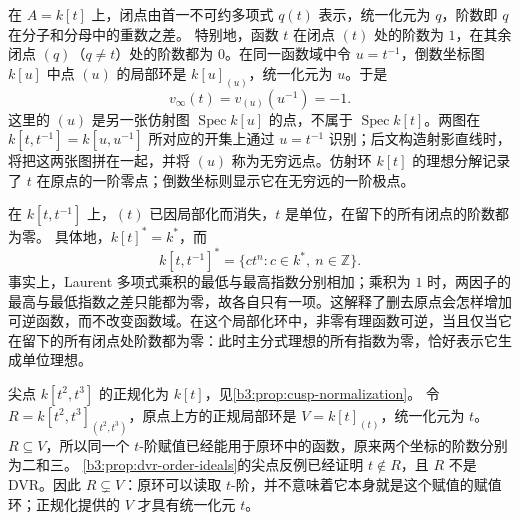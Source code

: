 \ProseParagraphBreak
在 \(A=k[t]\) 上，闭点由首一不可约多项式 \(q(t)\) 表示，统一化元为 \(q\)，阶数即 \(q\) 在分子和分母中的重数之差。 特别地，函数 \(t\) 在闭点 \((t)\) 处的阶数为 \(1\)，在其余闭点 \((q)\)（\(q\ne t\)）处的阶数都为 \(0\)。在同一函数域中令 \(u=t^{-1}\)，倒数坐标图 \(k[u]\) 中点 \((u)\) 的局部环是 \(k[u]_{(u)}\)，统一化元为 \(u\)。于是
\[
	v_\infty(t)=v_{(u)}(u^{-1})=-1.
\]
这里的 \((u)\) 是另一张仿射图 \(\operatorname{Spec}k[u]\) 的点，不属于 \(\operatorname{Spec}k[t]\)。两图在 \(k[t,t^{-1}]=k[u,u^{-1}]\) 所对应的开集上通过 \(u=t^{-1}\) 识别；后文构造射影直线时，将把这两张图拼在一起，并将 \((u)\) 称为无穷远点。仿射环 \(k[t]\) 的理想分解记录了 \(t\) 在原点的一阶零点；倒数坐标则显示它在无穷远的一阶极点。

\ProseParagraphBreak
在 \(k[t,t^{-1}]\) 上，\((t)\) 已因局部化而消失，\(t\) 是单位，在留下的所有闭点的阶数都为零。 具体地，\(k[t]^*=k^*\)，而
\[
	k[t,t^{-1}]^*=\{ct^n:c\in k^*,\ n\in\mathbb Z\}.
\]
事实上，Laurent 多项式乘积的最低与最高指数分别相加；乘积为 \(1\) 时，两因子的最高与最低指数之差只能都为零，故各自只有一项。这解释了删去原点会怎样增加可逆函数，而不改变函数域。在这个局部化环中，非零有理函数可逆，当且仅当它在留下的所有闭点处阶数都为零：此时主分式理想的所有指数为零，恰好表示它生成单位理想。

\ProseParagraphBreak
尖点 \(k[t^2,t^3]\) 的正规化为 \(k[t]\)，见\cref{b3:prop:cusp-normalization}。 令 \(R=k[t^2,t^3]_{(t^2,t^3)}\)，原点上方的正规局部环是 \(V=k[t]_{(t)}\)，统一化元为 \(t\)。\(R\subseteq V\)，所以同一个 \(t\)-阶赋值已经能用于原环中的函数，原来两个坐标的阶数分别为二和三。 \cref{b3:prop:dvr-order-ideals}的尖点反例已经证明 \(t\notin R\)，且 \(R\) 不是 DVR。因此 \(R\subsetneq V\)：原环可以读取 \(t\)-阶，并不意味着它本身就是这个赋值的赋值环；正规化提供的 \(V\) 才具有统一化元 \(t\)。
